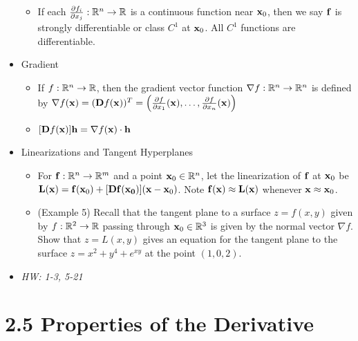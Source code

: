 \documentclass[11pt]{article}
\begin{document}
\begin{itemize}
\begin{itemize}
      \item If each \(\frac{\partial f_i}{\partial x_j}:\mathbb R^n\to\mathbb R\)
        is a continuous function near \(\mathbf{x}_0\), then we say \(\mathbf{f}\)
        is strongly differentiable or class \(C^1\) at \(\mathbf{x}_0\).
        All \(C^1\) functions are differentiable.
    \end{itemize}
  \item Gradient
    \begin{itemize}
      \item If \(f:\mathbb R^n\to\mathbb R\), then the gradient vector function
        \(\nabla f:\mathbb R^n\to\mathbb R^n\) is defined by
        \(
          \nabla f(\mathbf{x})
            =
          (\mathbf{D} f(\mathbf{x}))^T
            =
          \left(\frac{\partial f}{\partial x_1}(\mathbf{x}),\dots,\frac{\partial f}{\partial x_n}(\mathbf{x})\right)
        \)
      \item
        \(
          [\mathbf{D} f(\mathbf{x})]\mathbf{h}
            =
          \nabla f(\mathbf{x}) \cdot \mathbf{h}
        \)
    \end{itemize}
  \item Linearizations and Tangent Hyperplanes
    \begin{itemize}
      \item For \(\mathbf{f}:\mathbb R^n\to\mathbb R^m\) and a point \(\mathbf{x}_0\in\mathbb R^n\),
        let the linearization of \(\mathbf{f}\) at \(\mathbf{x}_0\) be
          \(
            \mathbf{L}(\mathbf{x})
              =
            \mathbf{f}(\mathbf{x}_0)+[\mathbf{D}\mathbf{f}(\mathbf{x_0})](\mathbf{x}-\mathbf{x}_0)
          \).
        Note \(\mathbf{f}(\mathbf{x})\approx\mathbf{L}(\mathbf{x})\) whenever
        \(\mathbf{x}\approx\mathbf{x}_0\).
      \item (Example 5) Recall that the tangent plane to a surface \(z=f(x,y)\)
        given by \(f:\mathbb R^2\to\mathbb R\) passing through \(\mathbf{x}_0\in\mathbb R^3\)
        is given by the normal vector \(\nabla f\).
        Show that \(z=L(x,y)\) gives an equation for the tangent plane to the
        surface \(z=x^2+y^4+e^{xy}\) at the point \((1,0,2)\).
    \end{itemize}
  \item\textit{
    HW: 1-3, 5-21
  }
\end{itemize}


\section*{2.5 Properties of the Derivative}
\end{document}
